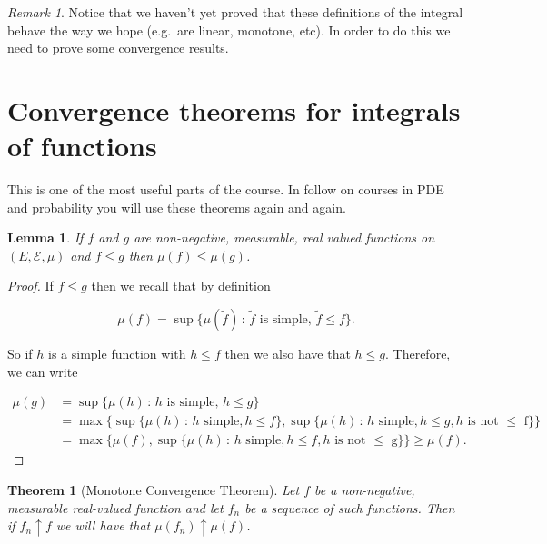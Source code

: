 \documentclass[
]{book}
\newtheorem{theorem}{Theorem}[chapter]
\newtheorem{lemma}{Lemma}[chapter]
\theoremstyle{definition}
\theoremstyle{definition}
\theoremstyle{definition}
\theoremstyle{definition}
\theoremstyle{remark}
\newtheorem*{remark}{Remark}
\begin{document}
\begin{remark}
Notice that we haven't yet proved that these definitions of the integral behave the way we hope (e.g.~are linear, monotone, etc). In order to do this we need to prove some convergence results.
\end{remark}

\hypertarget{convergence-theorems-for-integrals-of-functions}{%
\section{Convergence theorems for integrals of functions}\label{convergence-theorems-for-integrals-of-functions}}

This is one of the most useful parts of the course. In follow on courses in PDE and probability you will use these theorems again and again.

\begin{lemma}
If \(f\) and \(g\) are non-negative, measurable, real valued functions on \((E, \mathcal{E}, \mu)\) and \(f \leq g\) then \(\mu(f) \leq \mu(g)\).
\end{lemma}

\begin{proof}
If \(f \leq g\) then we recall that by definition

\[\mu(f) = \sup\{ \mu(\tilde{f}) \,:\, \mbox{$\tilde{f}$ is simple},\, \tilde{f} \leq f\}.\]

So if \(h\) is a simple function with \(h \leq f\) then we also have that \(h \leq g\). Therefore, we can write

\begin{align*} \mu(g) &= \sup\{ \mu(h) \,:\, \mbox{$h$ is simple},\, h \leq g\} \\ &= \max\{\sup\{ \mu(h)\, :\, \mbox{$h$ simple}, h \leq f\}, \sup\{ \mu(h)\, :\, \mbox{$h$ simple}, h \leq g, \mbox{$h$ is not $\leq$ f}\} \}\\ &= \max\{ \mu(f), \sup\{ \mu(h)\, :\, \mbox{$h$ simple}, h \leq f, \mbox{$h$ is not $\leq$ g}\}\} \geq \mu(f).\end{align*}
\end{proof}

\begin{theorem}[Monotone Convergence Theorem]
Let \(f\) be a non-negative, measurable real-valued function and let \(f_n\) be a sequence of such functions. Then if \(f_n \uparrow f\) we will have that \(\mu(f_n) \uparrow \mu(f)\).
\end{theorem}
\end{document}
